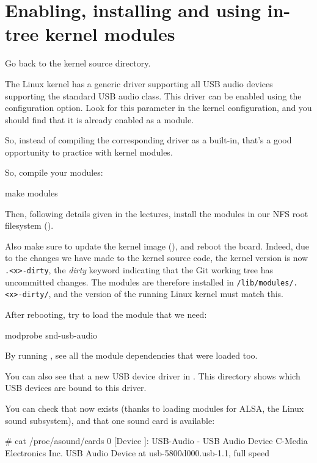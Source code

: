 {\section{Enabling, installing and using in-tree kernel modules}

Go back to the kernel source directory.

The Linux kernel has a generic driver supporting all USB audio devices
supporting the standard USB audio class. This driver can be enabled
using the  configuration option. Look
for this parameter in the kernel configuration, and you should find
that it is already enabled as a module.

So, instead of compiling the corresponding driver as a built-in, that's
a good opportunity to practice with kernel modules.

So, compile your modules:
\begin{bashinput}
make modules
\end{bashinput}

Then, following details given in the lectures, install the modules in our NFS
root filesystem ().

Also make sure to update the kernel image (), and reboot the
board.  Indeed, due to the changes we have made to the kernel source code,
the kernel version is now {\tt \workingkernel.<x>-dirty}, the {\em dirty}
keyword indicating that the Git working tree has uncommitted changes.
The modules are therefore installed in {\tt /lib/modules/\workingkernel.<x>-dirty/},
and the version of the running Linux kernel must match this.

After rebooting, try to load the module that we need:

\begin{bashinput}
modprobe snd-usb-audio
\end{bashinput}

By running , see all the module dependencies that
were loaded too.

You can also see that a new USB device driver in
. This directory shows which
USB devices are bound to this driver.

You can check that  now exists (thanks to loading
modules for ALSA, the Linux sound subsystem), and that one sound
card is available:

\begin{bashinput}
# cat /proc/asound/cards
 0 [Device         ]: USB-Audio - USB Audio Device
                      C-Media Electronics Inc. USB Audio Device at usb-5800d000.usb-1.1, full speed
\end{bashinput}

}
